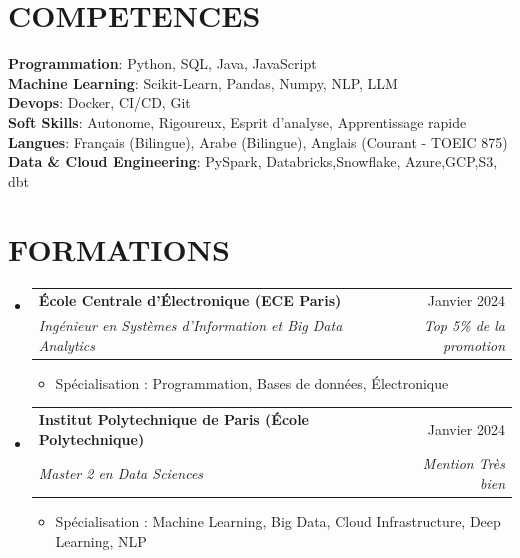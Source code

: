 \documentclass[11pt,a4paper]{article}
\makeatletter
\newcommand{\resumeItem}[1]{
  \item\footnotesize{
    {#1 \vspace{-1pt}}
  }
}
\newcommand{\resumeSubheading}[4]{
  \vspace{2pt}\item
    \begin{tabular*}{\textwidth}[t]{l@{\extracolsep{\fill}}r}
      {\footnotesize\textbf{#1}} & {\footnotesize#2} \\
      {\footnotesize\textit{#3}} & {\footnotesize\textit{#4}} \\
    \end{tabular*}\vspace{2pt}
}
\newcommand{\resumeSubHeadingListStart}{\begin{itemize}[leftmargin=0in, label={}]}
\newcommand{\resumeSubHeadingListEnd}{\end{itemize}}
\newcommand{\resumeItemListStart}{\begin{itemize}[label={\textbullet}]}
\newcommand{\resumeItemListEnd}{\end{itemize}\vspace{0pt}}
\makeatother
\begin{document}
\section{COMPETENCES}
\begin{itemize}[leftmargin=0in, label={}]
\footnotesize{\item{
{\footnotesize\textbf{Programmation}:} {\footnotesize Python, SQL, Java, JavaScript} \\
\vspace{3pt}
{\footnotesize\textbf{Machine Learning}:} {\footnotesize Scikit-Learn, Pandas, Numpy, NLP, LLM} \\
\vspace{3pt}
{\footnotesize\textbf{Devops}:} {\footnotesize Docker, CI/CD, Git} \\
\vspace{3pt}
{\footnotesize\textbf{Soft Skills}:} {\footnotesize Autonome, Rigoureux, Esprit d'analyse, Apprentissage rapide} \\
\vspace{3pt}
{\footnotesize\textbf{Langues}:} {\footnotesize Français (Bilingue), Arabe (Bilingue), Anglais (Courant - TOEIC 875)} \\
\vspace{3pt}
{\footnotesize\textbf{Data \& Cloud Engineering}:} {\footnotesize PySpark, Databricks,Snowflake, Azure,GCP,S3, dbt}
}
}
\end{itemize}

\section{FORMATIONS}
\resumeSubHeadingListStart
    \resumeSubheading
      {École Centrale d'Électronique (ECE Paris)}
      {Janvier 2024}
      {Ingénieur en Systèmes d'Information et Big Data Analytics}
      {Top 5\% de la promotion}
      \resumeItemListStart
        \resumeItem{Spécialisation : Programmation, Bases de données, Électronique}
      \resumeItemListEnd
    \resumeSubheading
      {Institut Polytechnique de Paris (École Polytechnique)}
      {Janvier 2024}
      {Master 2 en Data Sciences}
      {Mention Très bien}
      \resumeItemListStart
        \resumeItem{Spécialisation : Machine Learning, Big Data, Cloud Infrastructure, Deep Learning, NLP}
      \resumeItemListEnd
  \resumeSubHeadingListEnd
\end{document}
